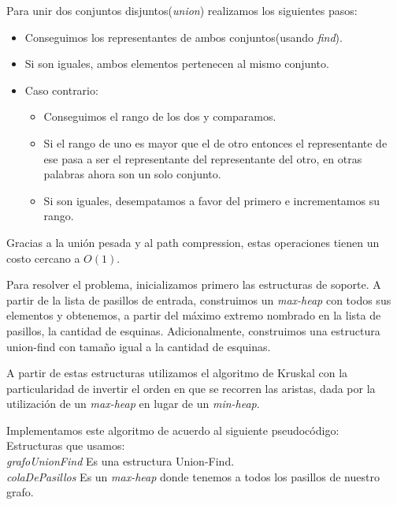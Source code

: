  Para unir dos conjuntos disjuntos(\textit{union}) realizamos los siguientes pasos:

\begin{itemize}
    \item Conseguimos los representantes de ambos conjuntos(usando \textit{find}).
    \item Si son iguales, ambos elementos pertenecen al mismo conjunto.
    \item Caso contrario:
    \begin{itemize}
         \item Conseguimos el rango de los dos y comparamos.
         \item Si el rango de uno es mayor que el de otro entonces el representante de ese pasa a ser el representante del representante del otro, en otras palabras ahora son un solo 
conjunto.
	 \item Si son iguales, desempatamos a favor del primero e incrementamos su rango.
    \end{itemize}
\end{itemize}

Gracias a la unión pesada y al path compression, estas operaciones tienen un costo cercano a $O(1)$.

Para resolver el problema, inicializamos primero las estructuras de soporte.
A partir de la lista de pasillos de entrada, construimos un \textit{max-heap} con todos sus elementos y obtenemos, a partir del máximo extremo nombrado en la lista de pasillos, la cantidad de esquinas. Adicionalmente, construimos una estructura union-find con tamaño igual a la cantidad de esquinas.

A partir de estas estructuras utilizamos el algoritmo de Kruskal con la particularidad de invertir el orden en que se recorren las aristas, dada por la utilización de un \textit{max-heap} en lugar de un \textit{min-heap}.

Implementamos este algoritmo de acuerdo al siguiente pseudocódigo:\\


\flushleft Estructuras que usamos:\\
\hspace{10pt}\textit{grafoUnionFind} Es una estructura Union-Find.\\
\hspace{10pt}\textit{colaDePasillos} Es un \textit{max-heap} donde tenemos a todos los pasillos de nuestro grafo.


